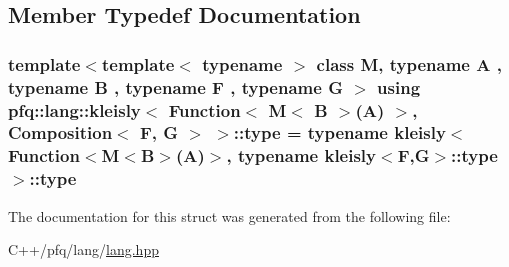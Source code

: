 \subsection{Member Typedef Documentation}
\hypertarget{structpfq_1_1lang_1_1kleisly_3_01Function_3_01M_3_01B_01_4_07A_08_01_4_00_01Composition_3_01F_00_01G_01_4_01_4_aa5c026817ce615e5e51ed76159b2e759}{
\subsubsection[{type}]{\setlength{\rightskip}{0pt plus 5cm}template$<$template$<$ typename $>$ class M, typename A , typename B , typename F , typename G $>$ using {\bf pfq\+::lang\+::kleisly}$<$ {\bf Function}$<$ M$<$ B $>$(A) $>$, {\bf Composition}$<$ F, G $>$ $>$\+::{\bf type} =  typename {\bf kleisly}$<$ {\bf Function}$<$M$<$B$>$(A)$>$, typename {\bf kleisly}$<$F,G$>$\+::{\bf type}$>$\+::{\bf type}}}\label{structpfq_1_1lang_1_1kleisly_3_01Function_3_01M_3_01B_01_4_07A_08_01_4_00_01Composition_3_01F_00_01G_01_4_01_4_aa5c026817ce615e5e51ed76159b2e759}


The documentation for this struct was generated from the following file\+:\begin{DoxyCompactItemize}
\item 
C++/pfq/lang/\hyperlink{lang_8hpp}{lang.\+hpp}\end{DoxyCompactItemize}
